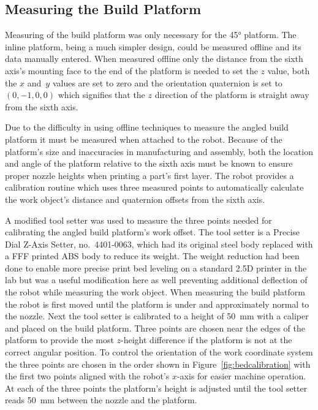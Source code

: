 \documentclass[main.tex]{subfiles}
\begin{document}
\subsection{Measuring the Build Platform}
Measuring of the build platform was only necessary for the \ang{45} platform.
The inline platform, being a much simpler design, could be measured offline and its data manually entered.
When measured offline only the distance from the sixth axis's mounting face to the end of the platform is needed to set the $z$ value, both the $x$ and~$y$ values are set to zero and the orientation quaternion is set to $(0,-1,0,0)$ which signifies that the $z$ direction of the platform is straight away from the sixth axis.

Due to the difficulty in using offline techniques to measure the angled build platform it must be measured when attached to the robot.
Because of the platform's size and inaccuracies in manufacturing and assembly, both the location and angle of the platform relative to the sixth axis must be known to ensure proper nozzle heights when printing a part's first layer.
The robot provides a calibration routine which uses three measured points to automatically calculate the work object's distance and quaternion offsets from the sixth axis.

A modified tool setter was used to measure the three points needed for calibrating the angled build platform's work offset.
The tool setter is a Precise Dial Z-Axis Setter, no.~4401-0063, which had its original steel body replaced with a FFF printed ABS body to reduce its weight.
The weight reduction had been done to enable more precise print bed leveling on a standard 2.5D printer in the lab but was a useful modification here as well preventing additional deflection of the robot while measuring the work object.
When measuring the build platform the robot is first moved until the platform is under and approximately normal to the nozzle.
Next the tool setter is calibrated to a height of \SI{50}{mm} with a caliper and placed on the build platform.
Three points are chosen near the edges of the platform to provide the most $z$\nobreakdash-height difference if the platform is not at the correct angular position.
To control the orientation of the work coordinate system the three points are chosen in the order shown in Figure~\ref{fig:bedcalibration} with the first two points aligned with the robot's $x$\nobreakdash-axis for easier machine operation.
At each of the three points the platform's height is adjusted until the tool setter reads \SI{50}{mm} between the nozzle and the platform.
\end{document}
